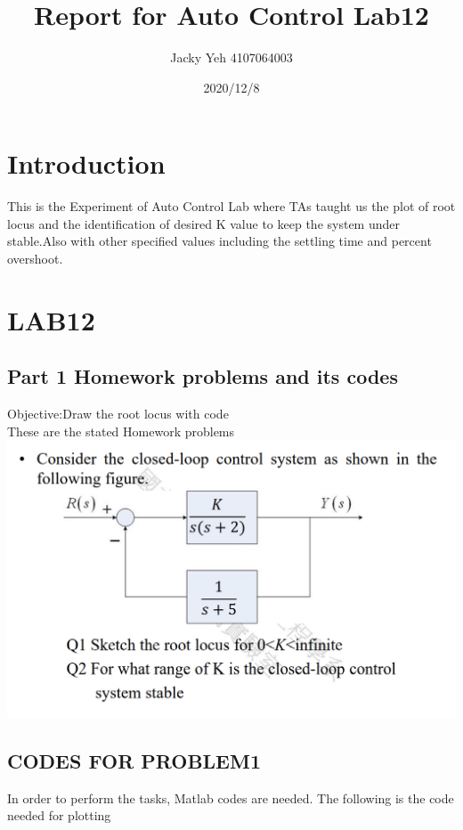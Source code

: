 \documentclass[12pt]{article}
\title{Report for Auto Control Lab12}
\date{2020/12/8}
\author{Jacky Yeh 4107064003}
\begin{document}
\begin{titlepage}

\maketitle
\end{titlepage}


\section{Introduction}
This is the Experiment of Auto Control Lab where TAs taught us the plot of root locus and the identification of desired K value to keep the system under stable.Also with other specified values including the settling time and percent overshoot.


\section{LAB12}
\subsection{Part 1 Homework problems and its codes}
Objective:Draw the root locus with code\\
These are the stated Homework problems\\
\includegraphics[scale=0.5]{../Lab12/Problem1.png}\\ 

\cleardoublepage
\subsection{CODES FOR PROBLEM1}
In order to perform the tasks, Matlab codes are needed. The following is the code needed for plotting\\
\end{document}
